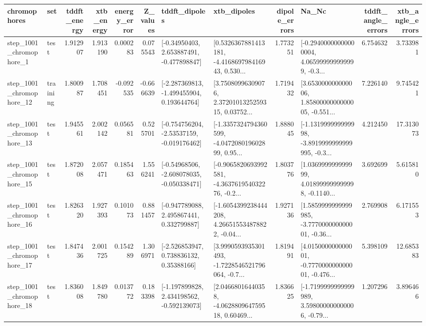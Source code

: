 \begin{tabular}{llrrrrllrlrr}
\toprule
             chromophores &       set &  tddft\_energy &  xtb\_energy &  energy\_error &  Z\_values &                               tddft\_dipoles &                                        xtb\_dipoles &  dipole\_errors &                                              Na\_Nc &  tddft\_angle\_errors &  xtb\_angle\_errors \\
\midrule
  step\_1001\_chromophore\_1 &      test &      1.912907 &    1.913190 &      0.000283 &  0.075543 &    [-0.34950403, 2.653887491, -0.477898847] &  [0.5326367881413181, -4.416869798416943, 0.530... &       1.773251 &  [-0.29400000000000004, 4.065999999999999, -0.3... &            6.754632 &          3.733981 \\
 step\_1001\_chromophore\_12 &  training &      1.800987 &    1.708451 &     -0.092535 & -0.666639 &   [-2.287369813, -1.499455904, 0.193644764] &  [3.75080996309076, 2.3720101325259315, 0.03752... &       1.719432 &  [3.653000000000006, 1.8580000000000005, -0.551... &            7.226140 &          9.745421 \\
 step\_1001\_chromophore\_13 &      test &      1.945561 &    2.002142 &      0.056581 &  0.525701 &   [-0.754756204, -2.53537159, -0.019176462] &  [-1.3357324794360599, -4.047208019602899, 0.95... &       1.888045 &  [-1.131999999999998, -3.8919999999999995, -0.3... &            4.212450 &         17.313073 \\
 step\_1001\_chromophore\_15 &      test &      1.872008 &    2.057471 &      0.185463 &  1.556241 &   [-0.54968506, -2.608078035, -0.050338471] &  [-0.9065820693992581, -4.363761954032276, -0.2... &       1.803776 &  [1.036999999999999, 4.018999999999998, -0.1140... &            3.692699 &          5.615810 \\
 step\_1001\_chromophore\_16 &      test &      1.826320 &    1.927393 &      0.101073 &  0.881457 &    [-0.947789088, 2.495867441, 0.332799887] &  [-1.6054399238444208, 4.266515534878822, -0.04... &       1.927136 &  [1.5859999999999985, -3.777000000000001, -0.36... &            2.769908 &          6.171553 \\
 step\_1001\_chromophore\_17 &      test &      1.847436 &    2.001725 &      0.154289 &  1.306971 &     [-2.526853947, 0.738836132, 0.35388166] &  [3.9990593935301493, -1.7228546521796064, -0.7... &       1.819491 &  [4.015000000000001, -0.777000000000001, -0.476... &            5.398109 &         12.685383 \\
 step\_1001\_chromophore\_18 &      test &      1.836008 &    1.849780 &      0.013772 &  0.183398 &   [-1.197899828, 2.434198562, -0.592139073] &  [2.04668016440358, -4.062880964759518, 0.60469... &       1.836625 &  [-1.7199999999999989, 3.598000000000006, -0.79... &            1.207296 &          3.896466 \\

\end{tabular}

